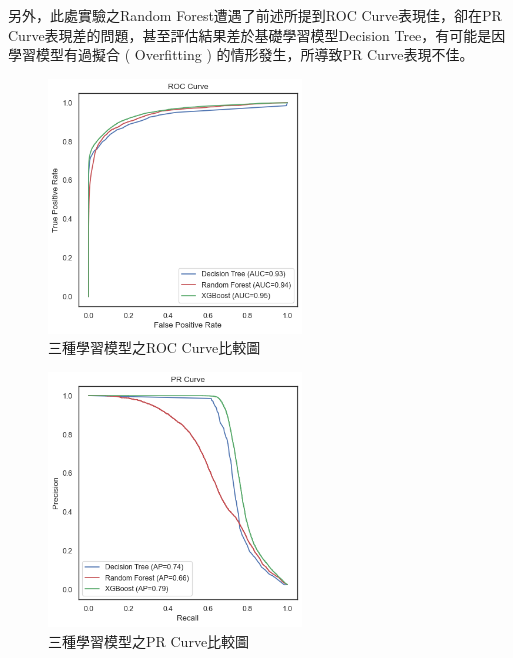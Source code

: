 另外，此處實驗之Random Forest遭遇了前述所提到ROC Curve表現佳，卻在PR Curve表現差的問題，甚至評估結果差於基礎學習模型Decision Tree，有可能是因學習模型有過擬合 ( Overfitting ) 的情形發生，所導致PR Curve表現不佳。
\newpage

\begin{figure}[!htb]
    \begin{center}
      \includegraphics[width=0.6\textwidth]{figures/evaluation/Image_ModelsROCCurve.png}
      \caption[三種學習模型之ROC Curve比較圖]{三種學習模型之ROC Curve比較圖}
      \label{fig:eva_ModelsROCCurve}
    \end{center}
\end{figure}

\begin{figure}[!htb]
    \begin{center}
      \includegraphics[width=0.6\textwidth]{figures/evaluation/Image_ModelsPRCurve.png}
      \caption[三種學習模型之PR Curve比較圖]{三種學習模型之PR Curve比較圖}
      \label{fig:eva_ModelsPRCurve}
    \end{center}
\end{figure}
\newpage

